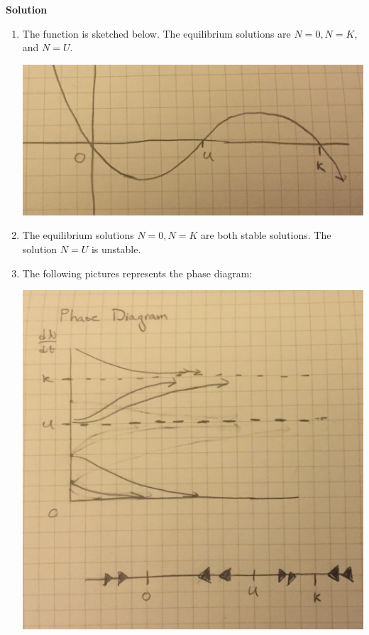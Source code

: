 \documentclass[12pt]{article}
\newenvironment{exercise}[2][Exercise]{\begin{trivlist}
\item[\hskip \labelsep {\bfseries #1}\hskip \labelsep {\bfseries #2.}]}{\end{trivlist}}
\begin{document}
\begin{exercise}{3}
\textbf{Solution}
\\
\begin{enumerate}
	\item[a)] The function is sketched below. The equilibrium solutions are $N = 0, N = K$, and $N = U$. \\
	\begin{center}
		\includegraphics[scale=.06]{graph}
	\end{center}
	\item[b)] The equilibrium solutions $N = 0, N = K$ are both stable solutions. The solution $N = U$ is unstable. 
	\item[c)] The following pictures represents the phase diagram: \\
	\begin{center}
	\includegraphics[scale=.08]{phasediagram3}

\end{center}
\end{enumerate}
\end{exercise}
\end{document}
